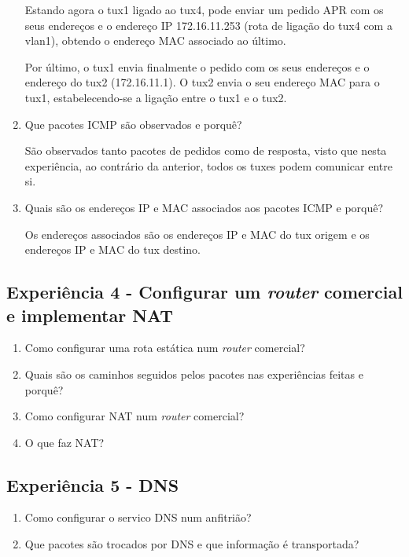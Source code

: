 \documentclass{article}
\begin{document}
\begin{enumerate}
Estando agora o tux1 ligado ao tux4, pode enviar um pedido APR com os seus endereços e o endereço IP  172.16.11.253 (rota de ligação do tux4 com a vlan1), obtendo o endereço MAC associado ao último.

Por último, o tux1 envia finalmente o pedido com os seus endereços e o endereço do tux2 (172.16.11.1). O tux2 envia o seu endereço MAC para o tux1, estabelecendo-se a ligação entre o tux1 e o tux2.


\item Que pacotes ICMP são observados e porquê?

São observados tanto pacotes de pedidos como de resposta, visto que nesta experiência, ao contrário da anterior, todos os tuxes podem comunicar entre si.

\item Quais são os endereços IP e MAC associados aos pacotes ICMP e porquê?

Os endereços associados são os endereços IP e MAC do tux origem e os endereços IP e MAC do tux destino.
\end{enumerate}
\subsection{Experiência 4 - Configurar um \textit{router} comercial e implementar NAT}
\begin{enumerate}
\item Como configurar uma rota estática num \textit{router} comercial?

\item Quais são os caminhos seguidos pelos pacotes nas experiências feitas e porquê?

\item Como configurar NAT num \textit{router} comercial?

\item O que faz NAT?
\end{enumerate}
\subsection{Experiência 5 - DNS}
\begin{enumerate}
\item Como configurar o servico DNS num anfitrião?

\item Que pacotes são trocados por DNS e que informação é transportada?
\end{enumerate}
\end{document}
